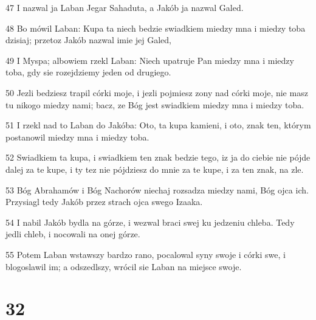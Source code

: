 \par 47 I nazwal ja Laban Jegar Sahaduta, a Jakób ja nazwal Galed.
\par 48 Bo mówil Laban: Kupa ta niech bedzie swiadkiem miedzy mna i miedzy toba dzisiaj; przetoz Jakób nazwal imie jej Galed,
\par 49 I Myspa; albowiem rzekl Laban: Niech upatruje Pan miedzy mna i miedzy toba, gdy sie rozejdziemy jeden od drugiego.
\par 50 Jezli bedziesz trapil córki moje, i jezli pojmiesz zony nad córki moje, nie masz tu nikogo miedzy nami; bacz, ze Bóg jest swiadkiem miedzy mna i miedzy toba.
\par 51 I rzekl nad to Laban do Jakóba: Oto, ta kupa kamieni, i oto, znak ten, którym postanowil miedzy mna i miedzy toba.
\par 52 Swiadkiem ta kupa, i swiadkiem ten znak bedzie tego, iz ja do ciebie nie pójde dalej za te kupe, i ty tez nie pójdziesz do mnie za te kupe, i za ten znak, na zle.
\par 53 Bóg Abrahamów i Bóg Nachorów niechaj rozsadza miedzy nami, Bóg ojca ich. Przysiagl tedy Jakób przez strach ojca swego Izaaka.
\par 54 I nabil Jakób bydla na górze, i wezwal braci swej ku jedzeniu chleba. Tedy jedli chleb, i nocowali na onej górze.
\par 55 Potem Laban wstawszy bardzo rano, pocalowal syny swoje i córki swe, i blogoslawil im; a odszedlszy, wrócil sie Laban na miejsce swoje.

\chapter{32}

